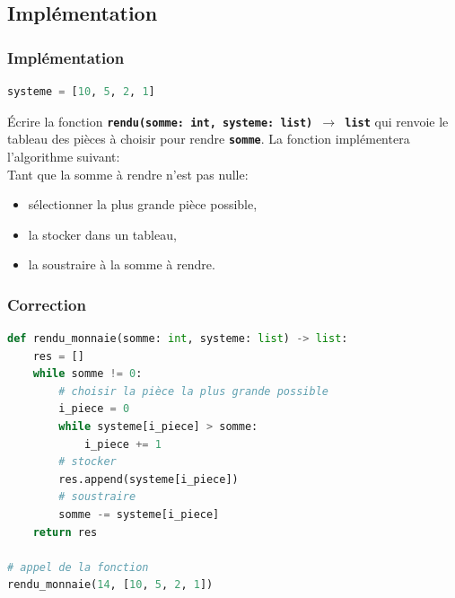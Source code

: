 \documentclass[svgnames,11pt]{beamer}
\begin{document}
\subsection{Implémentation}
\begin{frame}[fragile]
    \frametitle{Implémentation}

\begin{center}
\begin{lstlisting}[language=Python , basicstyle=\ttfamily\small, xleftmargin=2em, xrightmargin=2em]
systeme = [10, 5, 2, 1]
\end{lstlisting}
\label{CODE}
\end{center}
\begin{activite}
Écrire la fonction \textbf{\texttt{rendu(somme: int, systeme: list) $\rightarrow$ list}} qui renvoie le tableau des pièces à choisir pour rendre \textbf{\texttt{somme}}. La fonction implémentera l'algorithme suivant:\\
Tant que la somme à rendre n'est pas nulle:
\begin{itemize}
    \item sélectionner la plus grande pièce possible,
    \item la stocker dans un tableau,
    \item la soustraire à la somme à rendre.
\end{itemize}
\end{activite}
\end{frame}
\begin{frame}[fragile]
    \frametitle{Correction}

\begin{center}
\begin{lstlisting}[language=Python , basicstyle=\ttfamily\small, xleftmargin=.5em, xrightmargin=-1em]
def rendu_monnaie(somme: int, systeme: list) -> list:
    res = []
    while somme != 0:
        # choisir la pièce la plus grande possible
        i_piece = 0
        while systeme[i_piece] > somme:
            i_piece += 1
        # stocker
        res.append(systeme[i_piece])
        # soustraire
        somme -= systeme[i_piece]
    return res

# appel de la fonction
rendu_monnaie(14, [10, 5, 2, 1])
\end{lstlisting}
\label{CODE}
\end{center}   

\end{frame}
\end{document}
